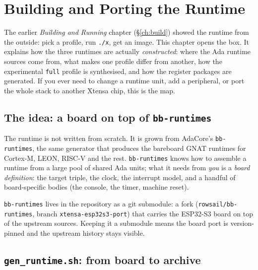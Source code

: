 \chapter{Building and Porting the Runtime}
\label{ch:runtime-build}

The earlier \emph{Building and Running} chapter (\S\ref{ch:build}) showed the
runtime from the outside: pick a profile, run \texttt{./x}, get an image. This
chapter opens the box. It explains how the three runtimes are actually
\emph{constructed}: where the Ada runtime sources come from, what makes one
profile differ from another, how the experimental \texttt{full} profile is
synthesised, and how the register packages are generated. If you ever need to
change a runtime unit, add a peripheral, or port the whole stack to another
Xtensa chip, this is the map.

\section{The idea: a board on top of \texttt{bb-runtimes}}

The runtime is not written from scratch. It is grown from AdaCore's
\texttt{bb-runtimes}, the same generator that produces the bareboard GNAT
runtimes for Cortex-M, LEON, RISC-V and the rest. \texttt{bb-runtimes} knows how
to assemble a runtime from a large pool of shared Ada units; what it needs from
\emph{you} is a \emph{board definition}: the target triple, the clock, the
interrupt model, and a handful of board-specific bodies (the console, the timer,
machine reset).

\texttt{bb-runtimes} lives in the repository as a git submodule: a fork
(\texttt{rowsail/bb-runtimes}, branch \texttt{xtensa-esp32s3-port}) that carries
the ESP32-S3 board on top of the upstream sources. Keeping it a submodule means
the board port is version-pinned and the upstream history stays visible.


\section{\texttt{gen\_runtime.sh}: from board to archive}

